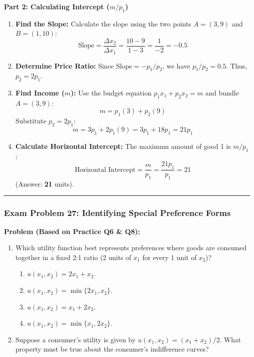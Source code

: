 \documentclass{article}
\begin{document}
\textbf{Part 2: Calculating Intercept ($m/p_1$)}
\begin{enumerate}
    \item \textbf{Find the Slope:} Calculate the slope using the two points $A=(3, 9)$ and $B=(1, 10)$:
    \[\text{Slope} = \frac{\Delta x_2}{\Delta x_1} = \frac{10 - 9}{1 - 3} = \frac{1}{-2} = -0.5\]
    \item \textbf{Determine Price Ratio:} Since $\text{Slope} = -p_1/p_2$, we have $p_1/p_2 = 0.5$. Thus, $p_2 = 2p_1$.
    \item \textbf{Find Income ($m$):} Use the budget equation $p_1 x_1 + p_2 x_2 = m$ and bundle $A=(3, 9)$:
    \[ m = p_1(3) + p_2(9) \]
    Substitute $p_2 = 2p_1$:
    \[ m = 3p_1 + 2p_1(9) = 3p_1 + 18p_1 = 21p_1 \]
    \item \textbf{Calculate Horizontal Intercept:} The maximum amount of good 1 is $m/p_1$:
    \[\text{Horizontal Intercept} = \frac{m}{p_1} = \frac{21 p_1}{p_1} = 21\]
    (Answer: \textbf{21} units).
\end{enumerate}

\bigskip\hrule\bigskip

\subsubsection*{Exam Problem 27: Identifying Special Preference Forms}

\textbf{Problem (Based on Practice Q6 \& Q8):}
\begin{enumerate}
    \item Which utility function best represents preferences where goods are consumed together in a fixed 2:1 ratio (2 units of $x_1$ for every 1 unit of $x_2$)?
    \begin{enumerate}
        \renewcommand{\theenumii}{\alph{enumii}}
        \renewcommand{\labelenumii}{(\theenumii)}
        \item $u(x_1, x_2) = 2x_1 + x_2$.
        \item $u(x_1, x_2) = \min\{2x_1, x_2\}$.
        \item $u(x_1, x_2) = x_1 + 2x_2$.
        \item $u(x_1, x_2) = \min\{x_1, 2x_2\}$.
    \end{enumerate}
    \item Suppose a consumer's utility is given by $u(x_1, x_2) = (x_1 + x_2)/2$. What property must be true about the consumer’s indifference curves?
\end{enumerate}
\end{document}
